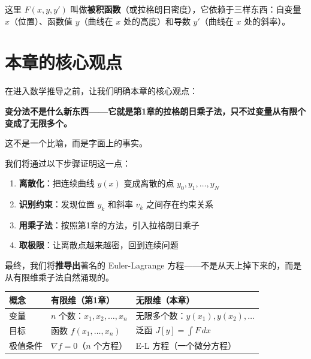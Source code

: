 这里 $F(x, y, y')$ 叫做\textbf{被积函数}（或拉格朗日密度），它依赖于三样东西：自变量 $x$（位置）、函数值 $y$（曲线在 $x$ 处的高度）和导数 $y'$（曲线在 $x$ 处的斜率）。

\section{本章的核心观点}

在进入数学推导之前，让我们明确本章的核心观点：

\begin{tcolorbox}[colback=yellow!10, colframe=orange!80, title=核心观点]
\textbf{变分法不是什么新东西——它就是第1章的拉格朗日乘子法，只不过变量从有限个变成了无限多个。}

这不是一个比喻，而是字面上的事实。
\end{tcolorbox}

我们将通过以下步骤证明这一点：

\begin{enumerate}
    \item \textbf{离散化}：把连续曲线 $y(x)$ 变成离散的点 $y_0, y_1, \ldots, y_N$
    \item \textbf{识别约束}：发现位置 $y_k$ 和斜率 $v_k$ 之间存在约束关系
    \item \textbf{用乘子法}：按照第1章的方法，引入拉格朗日乘子
    \item \textbf{取极限}：让离散点越来越密，回到连续问题
\end{enumerate}

最终，我们将\textbf{推导出}著名的 Euler-Lagrange 方程——不是从天上掉下来的，而是从有限维乘子法自然涌现的。

\begin{center}
\renewcommand{\arraystretch}{1.4}
\begin{tabular}{lll}
\toprule
\textbf{概念} & \textbf{有限维（第1章）} & \textbf{无限维（本章）} \\
\midrule
变量 & $n$ 个数：$x_1, x_2, \ldots, x_n$ & 无限多个数：$y(x_1), y(x_2), \ldots$ \\
目标 & 函数 $f(x_1, \ldots, x_n)$ & 泛函 $J[y] = \int F \, dx$ \\
极值条件 & $\nabla f = 0$（$n$ 个方程） & E-L 方程（一个微分方程） \\
\bottomrule
\end{tabular}
\end{center}

